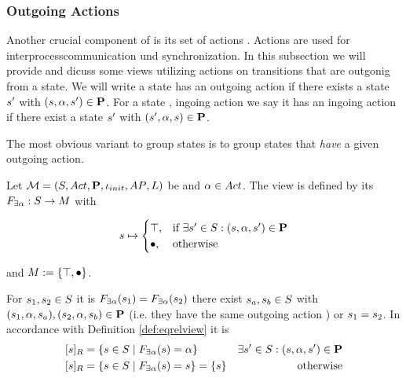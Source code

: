 \documentclass[preview]{standalone}
\begin{document}
\subsubsection{Outgoing Actions}
Another crucial component of \achgphN is its set of actions \actions. Actions are used for interprocesscommunication und synchronization. In this subsection we will provide and dicuss some views utilizing actions on transitions that are outgonig from a state. 
We will write a state \state has an outgoing action \action if there exists a state ${s}'$ with $({s}, {\alpha}, {s}') \in {\ensuremath{{\textbf{P}}}}$. For a state \state, ingoing action \action we say it has an ingoing action \action if there exist a state ${s}'$ with $({s}', {\alpha}, {s}) \in {\ensuremath{{\textbf{P}}}}$.

The most obvious variant to group states is to group states that \emph{have} a given outgoing action.

\begin{definition}
	Let ${{{\mathcal{M}}}} = {{({S}, {Act}, {\textbf{P}}, {\iota_{init}}, {AP}, {L})}}$ be \achgphN and ${\alpha} \in {Act}$. The view \viewhasoutaction is defined by its \grpfctN ${{F_{{\exists{\alpha}}}}} : {S} \to {\ensuremath{{M}}}$ with 
	
	\[
	{s} \mapsto
	\begin{cases}
			{\top},				& \text{if } \exists {s}' \in {S}: ({s}, {\alpha}, {s}') \in {\ensuremath{{\textbf{P}}}} \\
			{\bullet},          	& \text{otherwise}
		\end{cases}
	\]
	
	and ${{M}} := {\{{\top}, {\bullet}\}}$. %
\end{definition}


For ${s}_1,{s}_2 \in {S}$ it is ${{F_{{\exists{\alpha}}}}}({s}_1) = {{F_{{\exists{\alpha}}}}}({s}_2)$ \iffN 
there exist ${s}_{a},{s}_{b} \in {S}$ with 
$({s}_1, {\alpha}, {s}_{a}), ({s}_2, {\alpha}, {s}_{b}) \in {\ensuremath{{\textbf{P}}}}$ (i.e. they have the same outgoing action \action) or ${s}_1 = {s}_2$. 
In accordance with Definition \ref{def:eqrelview} it is
\begin{align*}
	{\ensuremath{{[{s}]_{{R}}}}} &= \{{s} \in {S} \mid {\ensuremath{{F_{{\exists{\alpha}}}}}}({s}) = {\alpha}\} &\exists{s}' \in {S} : ({s}, {\alpha}, {s}') \in {\ensuremath{{\textbf{P}}}} \\
	{{[{s}]_{{R}}}} &= \{{s} \in {S} \mid {\ensuremath{{F_{{\exists{\alpha}}}}}}({s}) = {s}\} = \{s\} &\text{ otherwise}
\end{align*}
\end{document}
